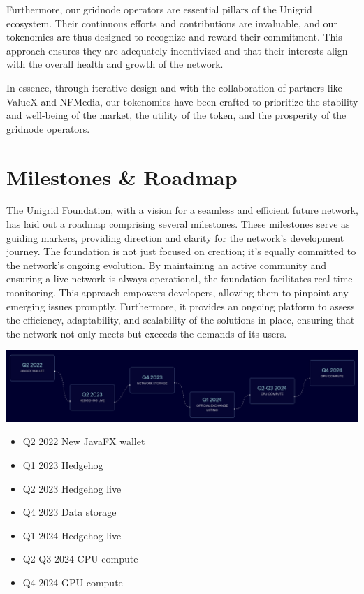 \documentclass[a4paper,oneside]{article}
\begin{document}
\begin{center}
	
\end{center}

Furthermore, our gridnode operators are essential pillars of the Unigrid ecosystem. Their continuous efforts and contributions are invaluable, and our tokenomics are thus designed to recognize and reward their commitment. This approach ensures they are adequately incentivized and that their interests align with the overall health and growth of the network.

\noindent In essence, through iterative design and with the collaboration of partners like ValueX and NFMedia, our tokenomics have been crafted to prioritize the stability and well-being of the market, the utility of the token, and the prosperity of the gridnode operators.

\section{Milestones \& Roadmap}
The Unigrid Foundation, with a vision for a seamless and efficient future network, has laid out a roadmap comprising several milestones. These milestones serve as guiding markers, providing direction and clarity for the network's development journey. The foundation is not just focused on creation; it's equally committed to the network's ongoing evolution. By maintaining an active community and ensuring a live network is always operational, the foundation facilitates real-time monitoring. This approach empowers developers, allowing them to pinpoint any emerging issues promptly. Furthermore, it provides an ongoing platform to assess the efficiency, adaptability, and scalability of the solutions in place, ensuring that the network not only meets but exceeds the demands of its users.

\vspace{0.05cm}
\begin{center}
	\includegraphics[width=381pt]{roadmap}
\end{center}

\begin{itemize}
  \item Q2 2022 New JavaFX wallet
  \item Q1 2023 Hedgehog
  \item Q2 2023 Hedgehog live
  \item Q4 2023 Data storage
  \item Q1 2024 Hedgehog live
  \item Q2-Q3 2024 CPU compute
  \item Q4 2024 GPU compute
\end{itemize}
\end{document}
